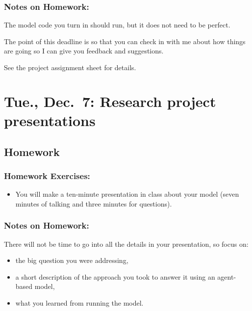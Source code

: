 \documentclass[
]{article}
\providecommand{\tightlist}{%
  \setlength{\itemsep}{0pt}\setlength{\parskip}{0pt}}
\begin{document}
\hypertarget{notes-on-homework-10}{%
\subsubsection{Notes on Homework:}\label{notes-on-homework-10}}

The model code you turn in should run, but it does not need to be
perfect.

The point of this deadline is so that you can check in with me about how
things are going so I can give you feedback and suggestions.

See the project assignment sheet for details.

\hypertarget{tue.-dec.-7-research-project-presentations}{%
\section{Tue., Dec.~7: Research project
presentations}\label{tue.-dec.-7-research-project-presentations}}

\hypertarget{homework-15}{%
\subsection{Homework}\label{homework-15}}

\hypertarget{homework-exercises-15}{%
\subsubsection{Homework Exercises:}\label{homework-exercises-15}}

\begin{itemize}
\tightlist
\item
  You will make a ten-minute presentation in class about your model
  (seven minutes of talking and three minutes for questions).
\end{itemize}

\hypertarget{notes-on-homework-11}{%
\subsubsection{Notes on Homework:}\label{notes-on-homework-11}}

There will not be time to go into all the details in your presentation,
so focus on:

\begin{itemize}
\tightlist
\item
  the big question you were addressing,
\item
  a short description of the approach you took to answer it using an
  agent-based model,
\item
  what you learned from running the model.
\end{itemize}
\end{document}
